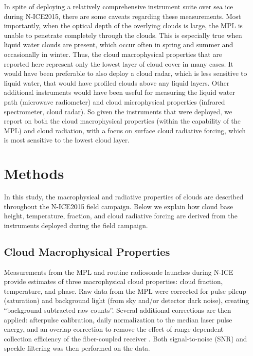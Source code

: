 In spite of deploying a relatively comprehensive instrument suite over sea ice during N-ICE2015, there are some caveats regarding these measurements. Most importantly, when the optical depth of the overlying clouds is large, the MPL is unable to penetrate completely through the clouds. This is especially true when liquid water clouds are present, which occur often in spring and summer and occasionally in winter. Thus, the cloud macrophysical properties that are reported here represent only the lowest layer of cloud cover in many cases. It would have been preferable to also deploy a cloud radar, which is less sensitive to liquid water, that would have profiled clouds above any liquid layers. Other additional instruments would have been useful for measuring the liquid water path (microwave radiometer) and cloud microphysical properties (infrared spectrometer, cloud radar). So given the instruments that were deployed, we report on both the cloud macrophysical properties (within the capability of the MPL) and cloud radiation, with a focus on surface cloud radiative forcing, which is most sensitive to the lowest cloud layer. 

\section{Methods}
In this study, the macrophysical and radiative properties of clouds are described throughout the N-ICE2015 field campaign. Below we explain how cloud base height, temperature, fraction, and cloud radiative forcing are derived from the instruments deployed during the field campaign.

\subsection{Cloud Macrophysical Properties}
Measurements from the MPL and routine radiosonde launches during N-ICE provide estimates of three macrophysical cloud properties: cloud fraction, temperature, and phase. Raw data from the MPL were corrected for pulse pileup (saturation) and background light (from sky and/or detector dark noise), creating “background-subtracted raw counts”. Several additional corrections are then applied: afterpulse calibration, daily normalization to the median laser pulse energy, and an overlap correction to remove the effect of range-dependent collection efficiency of the fiber-coupled receiver  \citep{campbell:2002, micropulse:2006}. Both signal-to-noise (SNR) and speckle filtering was then performed on the data.

